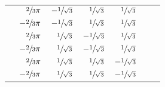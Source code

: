 \documentclass[article,pagebackref]{bespoke5}
\begin{document}
\begin{table}[htp]
\begin{center}
\begin{tabular}{crrrrcc}
						& $\sfrac{2}{3}\pi$		& $-\sfrac{1}{\sqrt{3}}$ & $\sfrac{1}{\sqrt{3}}$ & $\sfrac{1}{\sqrt{3}}$ & \\
						& $-\sfrac{2}{3}\pi$	& $-\sfrac{1}{\sqrt{3}}$ & $\sfrac{1}{\sqrt{3}}$ & $\sfrac{1}{\sqrt{3}}$ & \\

						& $\sfrac{2}{3}\pi$		& $\sfrac{1}{\sqrt{3}}$ & $-\sfrac{1}{\sqrt{3}}$ & $\sfrac{1}{\sqrt{3}}$ & \\
						& $-\sfrac{2}{3}\pi$	& $\sfrac{1}{\sqrt{3}}$ & $-\sfrac{1}{\sqrt{3}}$ & $\sfrac{1}{\sqrt{3}}$ & \\

						& $\sfrac{2}{3}\pi$		& $\sfrac{1}{\sqrt{3}}$ & $\sfrac{1}{\sqrt{3}}$ & $-\sfrac{1}{\sqrt{3}}$ & \\
						& $-\sfrac{2}{3}\pi$	& $\sfrac{1}{\sqrt{3}}$ & $\sfrac{1}{\sqrt{3}}$ & $-\sfrac{1}{\sqrt{3}}$ &
\end{tabular}
\end{center}
\label{default}
\end{table}%
\end{document}
